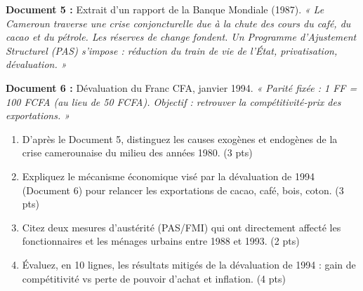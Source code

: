 \documentclass[11pt]{article}
\begin{document}
\begin{exercice}
\label{exo:crise_eco}
\textbf{Document 5 :} Extrait d'un rapport de la Banque Mondiale (1987). \textit{« Le Cameroun traverse une crise conjoncturelle due à la chute des cours du café, du cacao et du pétrole. Les réserves de change fondent. Un Programme d'Ajustement Structurel (PAS) s'impose : réduction du train de vie de l'État, privatisation, dévaluation. »}

\textbf{Document 6 :} Dévaluation du Franc CFA, janvier 1994. \textit{« Parité fixée : 1 FF = 100 FCFA (au lieu de 50 FCFA). Objectif : retrouver la compétitivité-prix des exportations. »}

\begin{enumerate}
    \item D'après le Document 5, distinguez les causes exogènes et endogènes de la crise camerounaise du milieu des années 1980. (3 pts)
    \item Expliquez le mécanisme économique visé par la dévaluation de 1994 (Document 6) pour relancer les exportations de cacao, café, bois, coton. (3 pts)
    \item Citez deux mesures d'austérité (PAS/FMI) qui ont directement affecté les fonctionnaires et les ménages urbains entre 1988 et 1993. (2 pts)
    \item Évaluez, en 10 lignes, les résultats mitigés de la dévaluation de 1994 : gain de compétitivité vs perte de pouvoir d'achat et inflation. (4 pts)
\end{enumerate}
\end{exercice}
\end{document}
